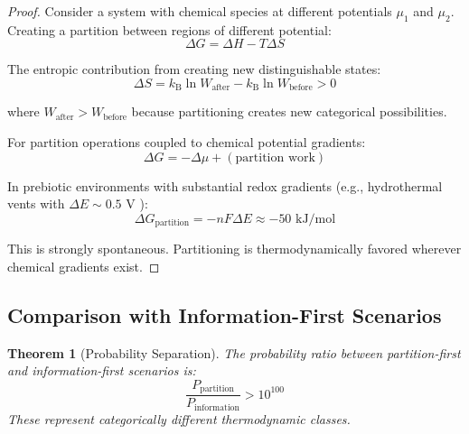 \documentclass[twocolumn,10pt,a4paper]{article}
\newtheorem{theorem}{Theorem}[section]
\theoremstyle{definition}
\theoremstyle{remark}
\newcommand{\kB}{k_{\mathrm{B}}}
\begin{document}
\begin{proof}
Consider a system with chemical species at different potentials $\mu_1$ and $\mu_2$. Creating a partition between regions of different potential:
\begin{equation}
    \Delta G = \Delta H - T\Delta S
\end{equation}

The entropic contribution from creating new distinguishable states:
\begin{equation}
    \Delta S = \kB \ln W_{\text{after}} - \kB \ln W_{\text{before}} > 0
\end{equation}

where $W_{\text{after}} > W_{\text{before}}$ because partitioning creates new categorical possibilities.

For partition operations coupled to chemical potential gradients:
\begin{equation}
    \Delta G = -\Delta\mu + (\text{partition work})
\end{equation}

In prebiotic environments with substantial redox gradients (e.g., hydrothermal vents with $\Delta E \sim 0.5$ V \cite{russell2007}):
\begin{equation}
    \Delta G_{\text{partition}} = -nF\Delta E \approx -50 \text{ kJ/mol}
\end{equation}

This is strongly spontaneous. Partitioning is thermodynamically favored wherever chemical gradients exist.
\end{proof}

\subsection{Comparison with Information-First Scenarios}

\begin{theorem}[Probability Separation]
\label{thm:probability}
The probability ratio between partition-first and information-first scenarios is:
\begin{equation}
    \frac{P_{\text{partition}}}{P_{\text{information}}} > 10^{100}
\end{equation}
These represent categorically different thermodynamic classes.
\end{theorem}
\end{document}
